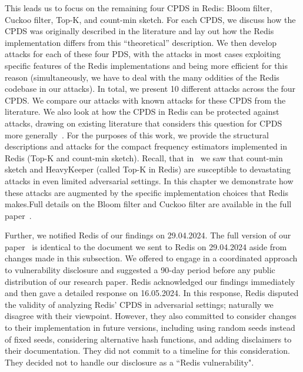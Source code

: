 This leads us to focus on the remaining four CPDS in Redis: Bloom filter, Cuckoo filter, Top-K, and count-min sketch. For each  CPDS, we discuss how the CPDS was originally described in the literature and lay out how the Redis implementation differs from this ``theoretical'' description. We then develop attacks for each of these four PDS, with the attacks in most cases exploiting specific features of the Redis implementations and being more efficient for this reason (simultaneously, we have to deal with the many oddities of the Redis codebase in our attacks). In total, we present 10 different attacks across the four CPDS. We compare our attacks with  known attacks for these CPDS from the literature. We also look at how the CPDS in Redis can be protected against attacks, drawing on existing literature that considers this question for CPDS more generally~\cite{clayton2019,FPUV22,PatersonR22,markelon23}. For the purposes of this work, we provide the structural descriptions and attacks for the compact frequency estimators implemented in Redis (Top-K and count-min sketch). Recall, that in~ we saw that count-min sketch and HeavyKeeper (called Top-K in Redis) are susceptible to devastating attacks in even limited adversarial settings. In this chapter we demonstrate how these attacks are augmented by the specific implementation choices that Redis makes.Full details on the Bloom filter and Cuckoo filter are available in the full paper~\cite{cryptoeprint:2024/1312}.

Further, we notified Redis of our findings on 29.04.2024. The full version of our paper~\cite{cryptoeprint:2024/1312} is identical to the document we sent to Redis on 29.04.2024 aside from changes made in this subsection. We offered to engage in a coordinated approach to vulnerability disclosure and suggested a 90-day period before any public distribution of our research paper. Redis acknowledged our findings immediately and then gave a detailed response on 16.05.2024. In this response, Redis disputed the validity of analyzing Redis' CPDS in adversarial settings; naturally we disagree with their viewpoint. However, they also committed to consider changes to their implementation in future versions, including using random seeds instead of fixed seeds, considering alternative hash functions, and adding disclaimers to their documentation. They did not commit to a timeline for this consideration. They decided not to handle our disclosure as a ``Redis vulnerability".
